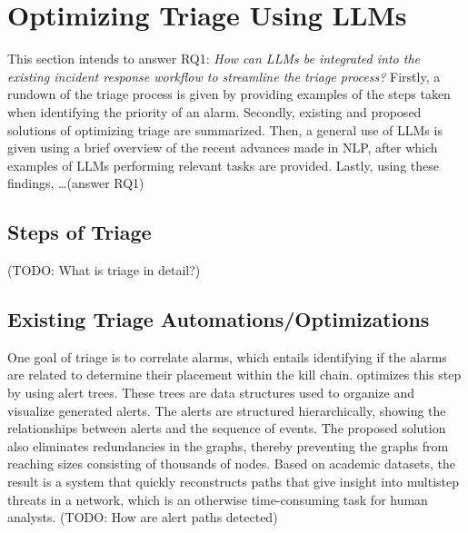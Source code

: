 \section{Optimizing Triage Using LLMs}
\label{sec:rq1}

This section intends to answer RQ1: \textit{How can LLMs be integrated into the existing incident response workflow to
streamline the triage process?}
Firstly, a rundown of the triage process is given by providing examples of the steps taken when identifying the priority
of an alarm.
Secondly, existing and proposed solutions of optimizing triage are summarized.
Then, a general use of LLMs is given using a brief overview of the recent advances made in NLP\@, after which examples
of LLMs performing relevant tasks are provided.
Lastly, using these findings, \dots (answer RQ1) %

\subsection{Steps of Triage}
\label{subsec:rq1-steps-of-triage}

(TODO: What is triage in detail?) %

\subsection{Existing Triage Automations/Optimizations}
\label{subsec:rq1-existing-optimizations}

One goal of triage is to correlate alarms, which entails identifying if the alarms are related to determine their
placement within the kill chain.
\citet{ficke2022reconstructing} optimizes this step by using alert trees.
These trees are data structures used to organize and visualize generated alerts.
The alerts are structured hierarchically, showing the relationships between alerts and the sequence of events.
The proposed solution also eliminates redundancies in the graphs, thereby preventing the graphs from reaching sizes
consisting of thousands of nodes.
Based on academic datasets, the result is a system that quickly reconstructs paths that give insight into multistep
threats in a network, which is an otherwise time-consuming task for human analysts.
(TODO: How are alert paths detected) %


